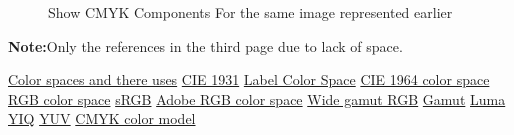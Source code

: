 \documentclass{article}
\begin{document}
\begin{multicols*}{2}
\begin{figure}[H]
	\caption{Show CMYK Components For the same image represented earlier}
	\end{figure}
	\textbf{Note:}Only the references in the third page due to lack of space.
	\begin{thebibliography}{9}
		\href{https://en.wikipedia.org/wiki/List_of_color_spaces_and_their_uses}{Color spaces and there uses}
		\href{https://en.wikipedia.org/wiki/CIE_1931_color_space}{CIE 1931}
		\href{https://en.wikipedia.org/wiki/Lab_color_space}{Label Color Space}
		\href{https://en.wikipedia.org/wiki/CIE_1964_color_space}{CIE 1964 color space}
		\href{https://en.wikipedia.org/wiki/RGB_color_space}{RGB color space}
		\href{https://en.wikipedia.org/wiki/SRGB}{sRGB}
		\href{https://en.wikipedia.org/wiki/Adobe_RGB_color_space}{Adobe RGB color space}
		\href{https://en.wikipedia.org/wiki/Wide-gamut_RGB_color_space}{Wide gamut RGB}
		\href{https://en.wikipedia.org/wiki/Gamut}{Gamut}
		\href{https://en.wikipedia.org/wiki/Luma_(video)}{Luma}
		\href{https://en.wikipedia.org/wiki/YIQ}{YIQ}
		\href{https://en.wikipedia.org/wiki/YUV}{YUV}
		\href{https://en.wikipedia.org/wiki/CMYK_color_model}{CMYK color model}
	\end{thebibliography}
	\end{multicols*}
\end{document}
